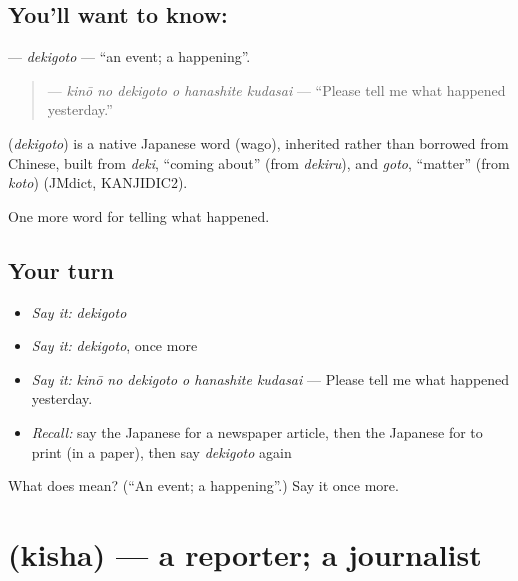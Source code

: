 \subsection*{You'll want to know: }
\textbf{} — \emph{dekigoto} — \textquotedblleft{}an event; a happening\textquotedblright{}.

\begin{quote}
\textbf{   } — \emph{kinō no dekigoto o hanashite kudasai} — \textquotedblleft{}Please tell me what happened yesterday.\textquotedblright{}
\end{quote}

\begin{cousinweb}
\textbf{} (\emph{dekigoto}) is a native Japanese word (wago), inherited rather than borrowed from Chinese, built from \emph{deki}, \textquotedblleft{}coming about\textquotedblright{} (from \emph{dekiru}), and \emph{goto}, \textquotedblleft{}matter\textquotedblright{} (from \emph{koto}) (JMdict, KANJIDIC2).
\end{cousinweb}

\begin{grammarlens}[title={What you've built}]
One more word for telling what happened.
\end{grammarlens}

\subsection*{Your turn}
\begin{itemize}
\raggedright
  \item \emph{Say it:} \emph{dekigoto}
  \item \emph{Say it:} \emph{dekigoto}, once more
  \item \emph{Say it:} \emph{kinō no dekigoto o hanashite kudasai} — Please tell me what happened yesterday.
  \item \emph{Recall:} say the Japanese for a newspaper article, then the Japanese for to print (in a paper), then say \emph{dekigoto} again
\end{itemize}

\begin{tcolorbox}[breakable,colback=teal!4,colframe=teal!35!black,title={Before you move on}]
What does  mean? (\textquotedblleft{}An event; a happening\textquotedblright{}.) Say it once more.
\end{tcolorbox}
\section[\texorpdfstring{\ja{きしゃ} (kisha)}{きしゃ (kisha)}]{ (kisha) — a reporter; a journalist}

